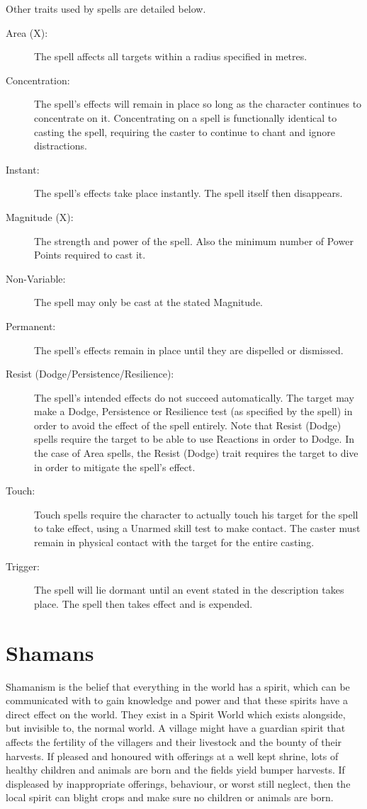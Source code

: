 Other traits used by spells are detailed below. 
\begin{description}
	\item[Area (X):] The spell affects all targets within a radius specified in metres. 
	\item[Concentration:] The spell’s effects will remain in place so long as the character continues to concentrate on it. Concentrating on a spell is functionally identical to casting the spell, requiring the caster to continue to chant and ignore distractions. 
	\item[Instant:] The spell’s effects take place instantly. The spell itself then disappears. 
	\item[Magnitude (X):] The strength and power of the spell. Also the minimum number of Power Points required to cast it. 
	\item[Non-Variable:] The spell may only be cast at the stated Magnitude.
	\item[Permanent:] The spell’s effects remain in place until they are dispelled or dismissed. 
	\item[Resist (Dodge/Persistence/Resilience):] The spell’s intended effects do not succeed automatically. The target may make a Dodge, Persistence or Resilience test (as specified by the spell) in order to avoid the effect of the spell entirely. Note that Resist (Dodge) spells require the target to be able to use Reactions in order to Dodge. In the case of Area spells, the Resist (Dodge) trait requires the target to dive in order to mitigate the spell’s effect. 
	\item[Touch:] Touch spells require the character to actually touch his target for the spell to take effect, using a Unarmed skill test to make contact. The caster must remain in physical contact with the target for the entire casting.
	\item[Trigger:] The spell will lie dormant until an event stated in the description takes place. The spell then takes effect and is expended.
\end{description}


\section{Shamans}
Shamanism is the belief that everything in the world has a spirit, which can be communicated with to gain knowledge and power and that these spirits have a direct effect on the world. They exist in a Spirit World which exists alongside, but invisible to, the normal world. A village might have a guardian spirit that affects the fertility of the villagers and their livestock and the bounty of their harvests. If pleased and honoured with offerings at a well kept shrine, lots of healthy children and animals are born and the fields yield bumper harvests. If displeased by inappropriate offerings, behaviour, or worst still neglect, then the local spirit can blight crops and make sure no children or animals are born.

